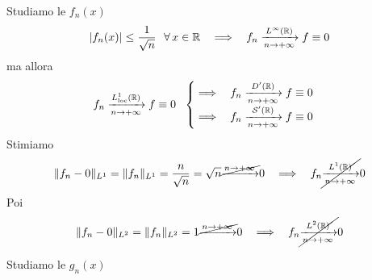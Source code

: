 Studiamo le $f_{n}(x)$
\begin{equation*}
| f_{n}(x)| \leq \frac{1}{\sqrt{n}} \ \ \forall x\in \RR  \ \ \implies \ \ f_{n}\xrightarrow[n\rightarrow + \infty ]{L^{\infty}(\RR)} f\equiv 0
\end{equation*}
ma allora
\begin{equation*}
f_{n}\xrightarrow[n\rightarrow + \infty ]{L^{1}_{\loc}(\RR)} f\equiv 0\ \ 
\begin{cases}
\implies \ \ f_{n}\xrightarrow[n\rightarrow + \infty ]{D'(\RR)} f\equiv 0\\
\implies \ \ f_{n}\xrightarrow[n\rightarrow + \infty ]{\Sc  '(\RR)} f\equiv 0
\end{cases}
\end{equation*}
Stimiamo
\begin{equation*}
\Vert f_{n} - 0\Vert_{L^{1}} = \Vert f_{n}\Vert_{L^{1}} = \frac{n}{\sqrt{n}} = \sqrt{n}\cancel{\xrightarrow{n\rightarrow + \infty}} 0\ \ \implies \ \ f_{n}\cancel{\xrightarrow[n\rightarrow + \infty ]{L^{1}(\RR)}} 0
\end{equation*}
Poi
\begin{equation*}
\Vert f_{n} - 0\Vert_{L^{2}} = \Vert f_{n}\Vert_{L^{2}} = 1\cancel{\xrightarrow{n\rightarrow + \infty}} 0\ \ \implies \ \ f_{n}\cancel{\xrightarrow[n\rightarrow + \infty ]{L^{2}(\mathbb{R})}} 0
\end{equation*}


Studiamo le $g_{n}(x)$

